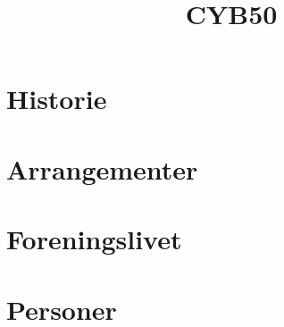 \documentclass[12pt, a4paper]{book}
\title{CYB50}
\date{}
\begin{document}
\maketitle

\newpage

\tableofcontents

\newpage

\part{Historie}

\part{Arrangementer}

\part{Foreningslivet}

\part{Personer}
\end{document}
